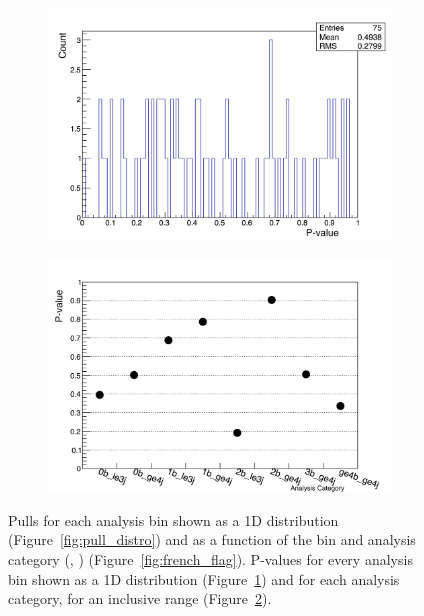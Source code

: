 \begin{figure}[h!]
\begin{subfigure}[b]{0.46\textwidth}
    \includegraphics[width=\textwidth]{Figs/results/v0/pulls/pvalue_per_bin_img.png}
    \caption{}
    \label{fig:pvalue_distro}
  \end{subfigure}
  \begin{subfigure}[b]{0.46\textwidth}
    \includegraphics[width=\textwidth]{Figs/results/v0/pulls/pvalue_vs_cat_img.png}
    \caption{}
    \label{fig:pvalue_per_cat}
  \end{subfigure}
  \caption{Pulls for each analysis bin shown as a 1D distribution
  (Figure~\ref{fig:pull_distro}) and as a function of the \HT bin and analysis
  category (\nj, \nb) (Figure~\ref{fig:french_flag}). P-values for every
  analysis bin shown as a 1D distribution (Figure~\ref{fig:pvalue_distro}) and
  for each analysis category, for an inclusive \HT range
  (Figure~\ref{fig:pvalue_per_cat}).}
  \label{fig:pull_analysis}
\end{figure}

